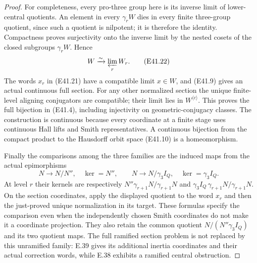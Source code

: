 \begin{proof}
For completeness, every pro-three group here
is its inverse limit of lower-central
quotients. An element in every
$\gamma_rW$ dies in every finite
three-group quotient, since such a quotient
is nilpotent; it is therefore the identity.
Compactness proves surjectivity onto the
inverse limit by the nested cosets of the
closed subgroups $\gamma_rW$. Hence
\[
 W\xrightarrow{\sim}\varprojlim_r W_r.
 \tag{E41.22}
\]
The words $x_r$ in (E41.21) have a compatible
limit $x\in W$, and (E41.9) gives an actual
continuous full section. For any other
normalized section the unique finite-level
aligning conjugators are compatible; their
limit lies in $W^{\langle c\rangle}$.
This proves the full bijection in (E41.4),
including injectivity on geometric-conjugacy
classes. The construction is continuous
because every coordinate at a finite stage
uses continuous Hall lifts and Smith
representatives. A continuous bijection
from the compact product to the Hausdorff
orbit space (E41.10) is a homeomorphism.

Finally the comparisons among the three
families are the induced maps from the
actual epimorphisms
\[
 N\longrightarrow N/N'',\quad\ker=N'',
 \qquad
 N\longrightarrow N/\gamma_3I_Q,\quad\ker=\gamma_3I_Q.
 \tag{E41.23}
\]
At level $r$ their kernels are respectively
$N''\gamma_{r+1}N/\gamma_{r+1}N$ and
$\gamma_3I_Q\,\gamma_{r+1}N/\gamma_{r+1}N$.
On the section coordinates, apply the
displayed quotient to the word $x_r$ and
then the just-proved unique normalization
in its target. These formulas specify the
comparison even when the independently
chosen Smith coordinates do not make it
a coordinate projection. They also retain
the common quotient $N/(N''\gamma_3I_Q)$
and its two quotient maps. The full
ramified section problem is not replaced
by this unramified family: E.39 gives its
additional inertia coordinates and their
actual correction words, while E.38
exhibits a ramified central obstruction.
\end{proof}
